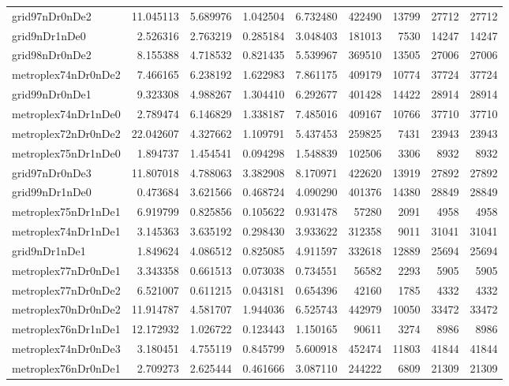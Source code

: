\begin{longtable}{|l|r|r|r|r|r|r|r|r|}
grid97nDr0nDe2 & 11.045113 & 5.689976 & 1.042504 & 6.732480 & 422490 & 13799 & 27712 & 27712 \\
grid9nDr1nDe0 & 2.526316 & 2.763219 & 0.285184 & 3.048403 & 181013 & 7530 & 14247 & 14247 \\
grid98nDr0nDe2 & 8.155388 & 4.718532 & 0.821435 & 5.539967 & 369510 & 13505 & 27006 & 27006 \\
metroplex74nDr0nDe2 & 7.466165 & 6.238192 & 1.622983 & 7.861175 & 409179 & 10774 & 37724 & 37724 \\
grid99nDr0nDe1 & 9.323308 & 4.988267 & 1.304410 & 6.292677 & 401428 & 14422 & 28914 & 28914 \\
metroplex74nDr1nDe0 & 2.789474 & 6.146829 & 1.338187 & 7.485016 & 409167 & 10766 & 37710 & 37710 \\
metroplex72nDr0nDe2 & 22.042607 & 4.327662 & 1.109791 & 5.437453 & 259825 & 7431 & 23943 & 23943 \\
metroplex75nDr1nDe0 & 1.894737 & 1.454541 & 0.094298 & 1.548839 & 102506 & 3306 & 8932 & 8932 \\
grid97nDr0nDe3 & 11.807018 & 4.788063 & 3.382908 & 8.170971 & 422620 & 13919 & 27892 & 27892 \\
grid99nDr1nDe0 & 0.473684 & 3.621566 & 0.468724 & 4.090290 & 401376 & 14380 & 28849 & 28849 \\
metroplex75nDr1nDe1 & 6.919799 & 0.825856 & 0.105622 & 0.931478 & 57280 & 2091 & 4958 & 4958 \\
metroplex74nDr1nDe1 & 3.145363 & 3.635192 & 0.298430 & 3.933622 & 312358 & 9011 & 31041 & 31041 \\
grid9nDr1nDe1 & 1.849624 & 4.086512 & 0.825085 & 4.911597 & 332618 & 12889 & 25694 & 25694 \\
metroplex77nDr0nDe1 & 3.343358 & 0.661513 & 0.073038 & 0.734551 & 56582 & 2293 & 5905 & 5905 \\
metroplex77nDr0nDe2 & 6.521007 & 0.611215 & 0.043181 & 0.654396 & 42160 & 1785 & 4332 & 4332 \\
metroplex70nDr0nDe2 & 11.914787 & 4.581707 & 1.944036 & 6.525743 & 442979 & 10050 & 33472 & 33472 \\
metroplex76nDr1nDe1 & 12.172932 & 1.026722 & 0.123443 & 1.150165 & 90611 & 3274 & 8986 & 8986 \\
metroplex74nDr0nDe3 & 3.180451 & 4.755119 & 0.845799 & 5.600918 & 452474 & 11803 & 41844 & 41844 \\
metroplex76nDr0nDe1 & 2.709273 & 2.625444 & 0.461666 & 3.087110 & 244222 & 6809 & 21309 & 21309 \\

\end{longtable}
